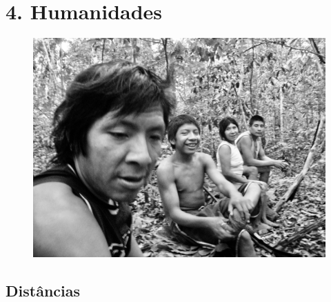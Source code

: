 
\chapter{4. Humanidades}\label{humanidades}

\begin{figure}[H]
\centering
  \includegraphics[width=\textwidth]{./imgs/100_5648}
\end{figure}

\section{Distâncias}\label{distuxe2ncias}

